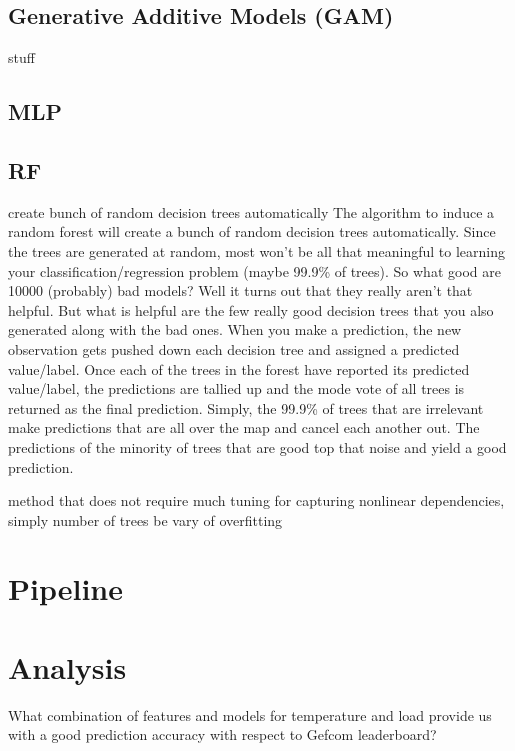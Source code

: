 \documentclass[conference]{IEEEtran}
\begin{document}
\subsection{Generative Additive Models (GAM)}
\vspace*{5cm}
stuff

\subsection{MLP}
\vspace*{2cm}

\subsection{RF}
create bunch of random decision trees automatically
The algorithm to induce a random forest will create a bunch of random decision trees automatically. Since the trees are generated at random, most won't be all that meaningful to learning your classification/regression problem (maybe 99.9\% of trees).
So what good are 10000 (probably) bad models? Well it turns out that they really aren't that helpful. But what is helpful are the few really good decision trees that you also generated along with the bad ones.
When you make a prediction, the new observation gets pushed down each decision tree and assigned a predicted value/label. Once each of the trees in the forest have reported its predicted value/label, the predictions are tallied up and the mode vote of all trees is returned as the final prediction.
Simply, the 99.9\% of trees that are irrelevant make predictions that are all over the map and cancel each another out. The predictions of the minority of trees that are good top that noise and yield a good prediction.

method that does not require much tuning for capturing nonlinear dependencies, simply number of trees
be vary of overfitting
\vspace*{2cm}

\section{Pipeline}
\vspace*{10cm}

\section{Analysis}
What combination of features and models for temperature and load provide us with a good prediction accuracy with respect to Gefcom leaderboard?
\end{document}
